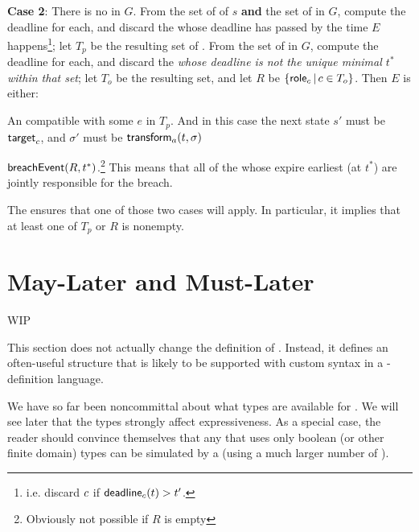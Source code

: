 \documentclass[12pt]{article}
\begin{document}
{\bf Case 2}: There is no \enabled \mustntran in $G$. From the set of \enabled \mayntrans of $s$ {\bf and} the set of \enabled \rmustntrans in $G$, compute the deadline for each, and discard the \connections whose deadline has passed by the time $E$ happens\footnote{i.e. discard $c$ if $\textsf{deadline}_{c}(t) > t'$.};  let $T_p$ be the resulting set of \connections. From the set of \enabled \rmustntrans in $G$, compute the deadline for each, and discard the {\connections} {\it whose deadline is not the unique minimal \TimeStamp $t^*$ within that set}; let $T_o$ be the resulting set, and let $R$ be $\{ \textsf{role}_{c} \, \vert \, c \in T_{o} \}$. Then $E$ is either:
\begin{PPI}
	\item An \Event compatible with some \connection $e$ in $T_p$. And in this case the next state $s'$ must be $\textsf{target}_{c}$, and $\sigma'$ must be $\textsf{transform}_{a}(t,\sigma)$
	\item $\textsf{breachEvent}(R,t^*)$.\footnote{Obviously not possible if $R$ is empty} This means that all of the \Roles whose \enabled \rmustntran expire earliest (at $t^*$) are jointly responsible for the breach.
\end{PPI}
The \bostgc ensures that one of those two cases will apply. In particular, it implies that at least one of $T_p$ or $R$ is nonempty.







\section{May-Later and Must-Later}  \label{slater}
WIP

This section does not actually change the definition of \Contract. Instead, it defines an often-useful \Contract structure that is likely to be supported with custom syntax in a \Contract-definition language.

We have so far been noncommittal about what types are available for \GVars.%
We will see later that the types strongly affect expressiveness. As a special case, the reader should convince themselves that any \Contract that uses only boolean (or other finite domain) types can be simulated by a \FSContract (using a much larger number of \States).
\end{document}
